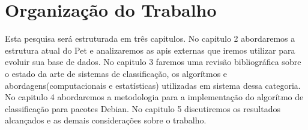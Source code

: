 \section{Organização do Trabalho}

        Esta pesquisa será estruturada em três capitulos. No capitulo 2 abordaremos a estrutura atual do Pet e analizaremos as apis externas que iremos utilizar para evoluir sua base de dados.
        No capitulo 3 faremos uma revisão bibliográfica sobre o estado da arte de sistemas de classificação, os algorítmos e abordagens(computacionais e estatísticas) utilizadas em sistema dessa categoria. No capitulo 4 abordaremos a metodologia para a implementação do algorítmo de classificação para pacotes Debian. No capitulo 5 discutiremos os resultados alcançados e as demais considerações sobre o trabalho.
